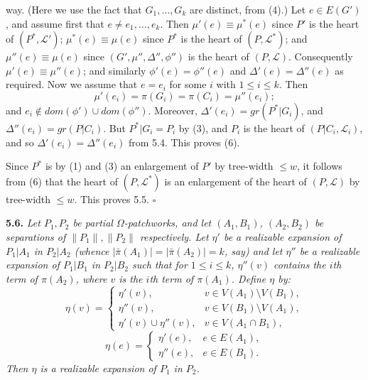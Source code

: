 \noindent way. (Here we use the fact that $G_1, \dots, G_k$ are distinct, from (4).) Let $e \in E(G')$, and assume first that $e \ne e_1, \dots, e_k$. Then $\mu'(e) \equiv \mu^*(e)$ since $P'$ is the heart of $(P^*, \mathscr{L}')$; $\mu^*(e) \equiv \mu(e)$ since $P^*$ is the heart of $(P, \mathscr{L}^*)$; and $\mu''(e) \equiv \mu(e)$ since $(G', \mu'', \Delta'', \phi'')$ is the heart of $(P, \mathscr{L})$. Consequently $\mu'(e) \equiv \mu''(e)$; and similarly $\phi'(e) = \phi''(e)$ and $\Delta'(e) = \Delta''(e)$ as required. Now we assume that $e = e_i$ for some $i$ with $1 \le i \le k$. Then
\begin{equation*}
\mu'(e_i) = \pi(G_i) = \pi(C_i) = \mu''(e_i);
\end{equation*}
and $e_i \notin dom(\phi') \cup dom(\phi'')$. Moreover, $\Delta'(e_i) = gr(P^*|G_i)$, and $\Delta''(e_i) = gr(P|C_i)$. But $P^*|G_i = P_i$ by (3), and $P_i$ is the heart of $(P|C_i, \mathscr{L}_i)$, and so $\Delta'(e_i) = \Delta''(e_i)$ from 5.4. This proves (6).

Since $P^*$ is by (1) and (3) an enlargement of $P'$ by tree-width $\le w$, it follows from (6) that the heart of $(P, \mathscr{L}^*)$ is an enlargement of the heart of $(P, \mathscr{L})$ by tree-width $\le w$. This proves 5.5. $\square$

\textbf{5.6.} \textit{Let $P_1, P_2$ be partial $\Omega$-patchworks, and let $(A_1, B_1)$, $(A_2, B_2)$ be separations of $\|P_1\|, \|P_2\|$ respectively. Let $\eta'$ be a realizable expansion of $P_1|A_1$ in $P_2|A_2$ (whence $|\bar{\pi}(A_1)| = |\bar{\pi}(A_2)| = k$, say) and let $\eta''$ be a realizable expansion of $P_1|B_1$ in $P_2|B_2$ such that for $1 \le i \le k$, $\eta''(v)$ contains the $i$th term of $\pi(A_2)$, where $v$ is the $i$th term of $\pi(A_1)$. Define $\eta$ by:}
\begin{equation*}
\eta(v) = \begin{cases}
\eta'(v), & v \in V(A_1) \setminus V(B_1), \\
\eta''(v), & v \in V(B_1) \setminus V(A_1), \\
\eta'(v) \cup \eta''(v), & v \in V(A_1 \cap B_1),
\end{cases}
\end{equation*}
\begin{equation*}
\eta(e) = \begin{cases}
\eta'(e), & e \in E(A_1), \\
\eta''(e), & e \in E(B_1).
\end{cases}
\end{equation*}
\textit{Then $\eta$ is a realizable expansion of $P_1$ in $P_2$.}

